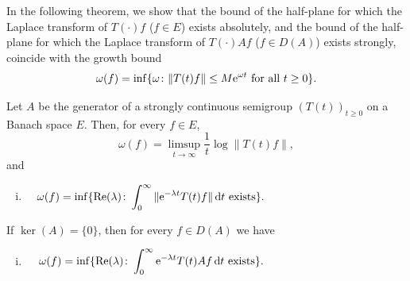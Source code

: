 In the following theorem, we show that the bound of the half-plane for which the Laplace transform of\/ $T(\cdot)f$ ($f \in E$) exists absolutely, and the bound of the half-plane for which the Laplace transform of\/ $T(\cdot)Af$ ($f \in D(A)$) exists strongly, coincide with the growth bound 
%
\[
	\omega(f) = \inf\{\omega\colon\|T(t)f\| \leq M\eu^{\omega t} \text{ for all } t \geq 0\} .
\]
%
\begin{theorem}\label{thm:a4-1.3}
Let $A$ be the generator of a strongly continuous semigroup $ (T(t))_{t \geq 0} $ on a Banach space $E$. 
Then, for every $f \in E$,
\begin{equation}\label{eq:a4-1.2}
\omega(f) = \limsup_{t \to \infty} \frac{1}{t}\log\|T(t)f\|, 
\end{equation}
and
\begin{enumerate}[(i)]
\item 
$\displaystyle\quad
\omega(f) = \inf\{\mathop{}\!\mathrm{Re}(\lambda)\colon\int_{0}^{\infty} \|\mathrm{e}^{-\lambda t} T(t)f\|  \mathop{}\!\mathrm{d}{t} \text{ exists}\} .$
\end{enumerate}
If\/ $\ker(A) = \{0\}$, then for every $f \in D(A)$ we have
\begin{enumerate}[(i), resume]
\item 
$\displaystyle\quad
\,\omega(f) = \inf\{\mathop{}\!\mathrm{Re}(\lambda)\colon\int_{0}^{\infty} \mathrm{e}^{-\lambda t} T(t)Af  \mathop{}\!\mathrm{d}{t}
\text{ exists}\} .$
\end{enumerate}
\end{theorem}
